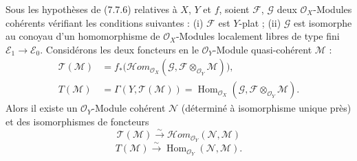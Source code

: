 \begin{corollary}[7.7.8]
Sous les hypothèses de (7.7.6) relatives à $X$, $Y$ et $f$, soient $\mathscr F$,
$\mathscr G$ deux $\mathscr O_X$-Modules cohérents vérifiant les conditions
suivantes : (i) $\mathscr F$ est $Y$-plat ; (ii) $\mathscr G$ est isomorphe au
conoyau d'un homomorphisme de $\mathscr O_X$-Modules localement libres de type
fini $\mathscr E_1\to\mathscr E_0$. Considérons les deux foncteurs en le
$\mathscr O_Y$-Module quasi-cohérent $\mathscr M$ :
\begin{align*}
  \mathscr T(\mathscr M)
  &=
  f_*
  \bigl(
    \mathscr{H}\!om_{\mathscr O_X}
      (\mathscr G,\mathscr F\otimes_{\mathscr O_Y}\mathscr M)
  \bigr),\\
  T(\mathscr M)
  &=
  \Gamma(Y,\mathscr T(\mathscr M))
  =
  \operatorname{Hom}_{\mathscr O_X}
    (\mathscr G,\mathscr F\otimes_{\mathscr O_Y}\mathscr M).
\end{align*}
Alors il existe un $\mathscr O_Y$-Module cohérent $\mathscr N$ (déterminé à
isomorphisme unique près) et des isomorphismes de foncteurs
\[
  \mathscr T(\mathscr M)
  \xrightarrow{\sim}
  \mathscr{H}\!om_{\mathscr O_Y}(\mathscr N,\mathscr M)
  \tag{7.7.8.1}\label{III.7.7.8.1.fr}
\]
\[
  T(\mathscr M)
  \xrightarrow{\sim}
  \operatorname{Hom}_{\mathscr O_Y}(\mathscr N,\mathscr M).
  \tag{7.7.8.2}\label{III.7.7.8.2.fr}
\]
\end{corollary}

